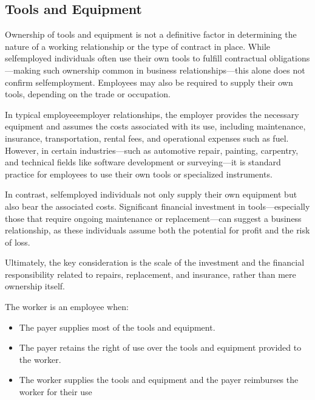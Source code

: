 \documentclass[letterpaper,10pt,english]{sphinxmanual}
\begin{document}
\subsection{Tools and Equipment}
\label{\detokenize{3_contracts:tools-and-equipment}}
\sphinxAtStartPar
Ownership of tools and equipment is not a definitive factor in determining the nature of a working relationship or the type
of contract in place. While self\sphinxhyphen{}employed individuals often use their own tools to fulfill contractual obligations—making
such ownership common in business relationships—this alone does not confirm self\sphinxhyphen{}employment. Employees may also be required
to supply their own tools, depending on the trade or occupation.

\sphinxAtStartPar
In typical employee\sphinxhyphen{}employer relationships, the employer provides the necessary equipment and assumes the costs associated
with its use, including maintenance, insurance, transportation, rental fees, and operational expenses such as fuel. However,
in certain industries—such as automotive repair, painting, carpentry, and technical fields like software development or
surveying—it is standard practice for employees to use their own tools or specialized instruments.

\sphinxAtStartPar
In contrast, self\sphinxhyphen{}employed individuals not only supply their own equipment but also bear the associated costs. Significant
financial investment in tools—especially those that require ongoing maintenance or replacement—can suggest a business
relationship, as these individuals assume both the potential for profit and the risk of loss.

\sphinxAtStartPar
Ultimately, the key consideration is the scale of the investment and the financial responsibility related to repairs,
replacement, and insurance, rather than mere ownership itself.

\sphinxAtStartPar
The worker is an employee when:
\begin{itemize}
\item {} 
\sphinxAtStartPar
The payer supplies most of the tools and equipment.

\item {} 
\sphinxAtStartPar
The payer retains the right of use over the tools and equipment provided to the worker.

\item {} 
\sphinxAtStartPar
The worker supplies the tools and equipment and the payer reimburses the worker for their use

\end{itemize}
\end{document}
